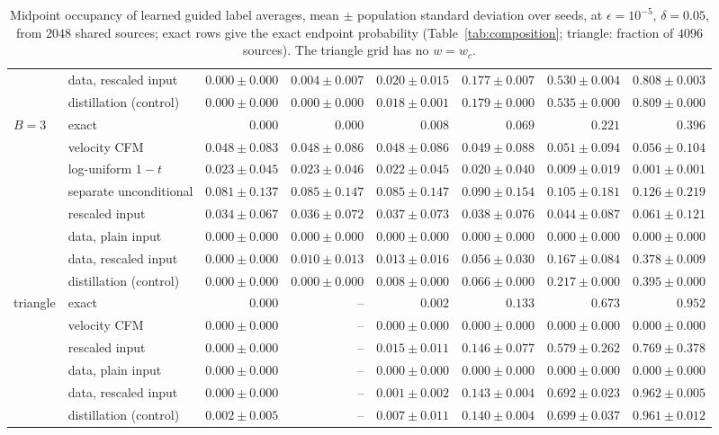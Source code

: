 \documentclass{article} %
\newif\ificlr
\theoremstyle{plain}
\theoremstyle{definition}
\theoremstyle{remark}
\begin{document}
\begin{table}[htb]
{\begin{tabular}{@{}llrrrrrr@{}}
 & data, rescaled input & $0.000\pm0.000$ & $0.004\pm0.007$ & $0.020\pm0.015$ & $0.177\pm0.007$ & $0.530\pm0.004$ & $0.808\pm0.003$\\
 & distillation (control) & $0.000\pm0.000$ & $0.000\pm0.000$ & $0.018\pm0.001$ & $0.179\pm0.000$ & $0.535\pm0.000$ & $0.809\pm0.000$\\
\midrule
$B=3$ & exact & $0.000$ & $0.000$ & $0.008$ & $0.069$ & $0.221$ & $0.396$\\
 & velocity CFM & $0.048\pm0.083$ & $0.048\pm0.086$ & $0.048\pm0.086$ & $0.049\pm0.088$ & $0.051\pm0.094$ & $0.056\pm0.104$\\
 & \quad log-uniform $1-t$ & $0.023\pm0.045$ & $0.023\pm0.046$ & $0.022\pm0.045$ & $0.020\pm0.040$ & $0.009\pm0.019$ & $0.001\pm0.001$\\
 & \quad separate unconditional & $0.081\pm0.137$ & $0.085\pm0.147$ & $0.085\pm0.147$ & $0.090\pm0.154$ & $0.105\pm0.181$ & $0.126\pm0.219$\\
 & \quad rescaled input & $0.034\pm0.067$ & $0.036\pm0.072$ & $0.037\pm0.073$ & $0.038\pm0.076$ & $0.044\pm0.087$ & $0.061\pm0.121$\\
 & data, plain input & $0.000\pm0.000$ & $0.000\pm0.000$ & $0.000\pm0.000$ & $0.000\pm0.000$ & $0.000\pm0.000$ & $0.000\pm0.000$\\
 & data, rescaled input & $0.000\pm0.000$ & $0.010\pm0.013$ & $0.013\pm0.016$ & $0.056\pm0.030$ & $0.167\pm0.084$ & $0.378\pm0.009$\\
 & distillation (control) & $0.000\pm0.000$ & $0.000\pm0.000$ & $0.008\pm0.000$ & $0.066\pm0.000$ & $0.217\pm0.000$ & $0.395\pm0.000$\\
\midrule
triangle & exact & $0.000$ & -- & $0.002$ & $0.133$ & $0.673$ & $0.952$\\
 & velocity CFM & $0.000\pm0.000$ & -- & $0.000\pm0.000$ & $0.000\pm0.000$ & $0.000\pm0.000$ & $0.000\pm0.000$\\
 & \quad rescaled input & $0.000\pm0.000$ & -- & $0.015\pm0.011$ & $0.146\pm0.077$ & $0.579\pm0.262$ & $0.769\pm0.378$\\
 & data, plain input & $0.000\pm0.000$ & -- & $0.000\pm0.000$ & $0.000\pm0.000$ & $0.000\pm0.000$ & $0.000\pm0.000$\\
 & data, rescaled input & $0.000\pm0.000$ & -- & $0.001\pm0.002$ & $0.143\pm0.004$ & $0.692\pm0.023$ & $0.962\pm0.005$\\
 & distillation (control) & $0.002\pm0.005$ & -- & $0.007\pm0.011$ & $0.140\pm0.004$ & $0.699\pm0.037$ & $0.961\pm0.012$\\
\bottomrule
\end{tabular}}
\ificlr\resizebox{\textwidth}{!}{\lctable}\else\lctable\fi
\caption{Midpoint occupancy of learned guided label averages, mean $\pm$ population standard
deviation over seeds, at $\epsilon=10^{-5}$, $\delta=0.05$, from $2048$ shared sources; exact
rows give the exact endpoint probability (Table~\ref{tab:composition}; triangle: fraction of
$4096$ sources). The triangle grid has no $w=w_c$.}
\label{tab:learned-composition}
\end{table}
\end{document}
